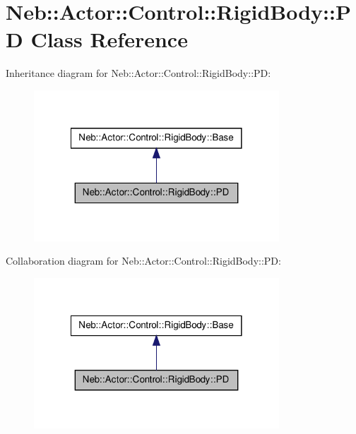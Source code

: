 \hypertarget{classNeb_1_1Actor_1_1Control_1_1RigidBody_1_1PD}{\section{\-Neb\-:\-:\-Actor\-:\-:\-Control\-:\-:\-Rigid\-Body\-:\-:\-P\-D \-Class \-Reference}
\label{classNeb_1_1Actor_1_1Control_1_1RigidBody_1_1PD}
}


\-Inheritance diagram for \-Neb\-:\-:\-Actor\-:\-:\-Control\-:\-:\-Rigid\-Body\-:\-:\-P\-D\-:\nopagebreak
\begin{figure}[H]
\begin{center}
\leavevmode
\includegraphics[width=260pt]{classNeb_1_1Actor_1_1Control_1_1RigidBody_1_1PD__inherit__graph}
\end{center}
\end{figure}


\-Collaboration diagram for \-Neb\-:\-:\-Actor\-:\-:\-Control\-:\-:\-Rigid\-Body\-:\-:\-P\-D\-:\nopagebreak
\begin{figure}[H]
\begin{center}
\leavevmode
\includegraphics[width=260pt]{classNeb_1_1Actor_1_1Control_1_1RigidBody_1_1PD__coll__graph}
\end{center}
\end{figure}
